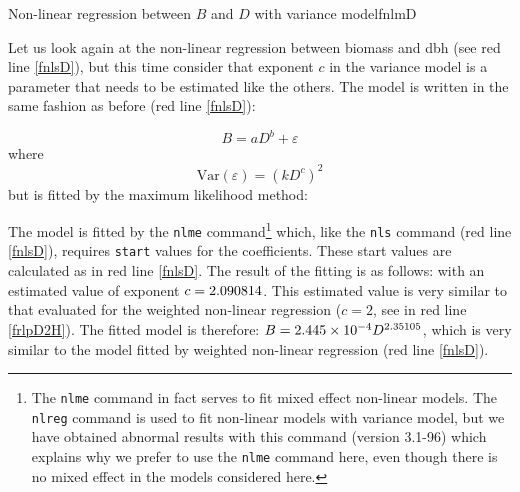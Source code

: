 \begin{filrouge}{Non-linear regression between $B$ and $D$ with variance model}{fnlmD}%

Let us look again at the non-linear regression between biomass and dbh (see red line \ref{fnlsD}), but this time consider that exponent $c$ in the variance model is a parameter that needs to be estimated like the others. The model is written in the same fashion as before (red line \ref{fnlsD}):

\[
B=aD^b+\varepsilon
\]
where
\[
\mathrm{Var}(\varepsilon)=(kD^c)^2
\]
but is fitted by the maximum likelihood method:

%
The model is fitted by the \texttt{nlme} command\footnote{The \texttt{nlme} command in fact serves to fit mixed effect non-linear models. The \texttt{nlreg} command is used to fit non-linear models with variance model, but we have obtained abnormal results with this command (version 3.1-96) which explains why we prefer to use the \texttt{nlme} command here, even though there is no mixed effect in the models considered here.} which, like the \texttt{nls} command (red line \ref{fnlsD}), requires \texttt{start} values for the coefficients. These start values are calculated as in red line \ref{fnlsD}. The result of the fitting is as follows:
%
with an estimated value of exponent $c=\mbox{2.090814}$. This estimated value is very similar to that evaluated for the weighted non-linear regression ($c=2$, see in red line \ref{frlpD2H}). The fitted model is therefore: $B=\mbox{2.445}\times10^{-4}D^{2.35105}$, which is very similar to the model fitted by weighted non-linear regression (red line \ref{fnlsD}).


\end{filrouge}

